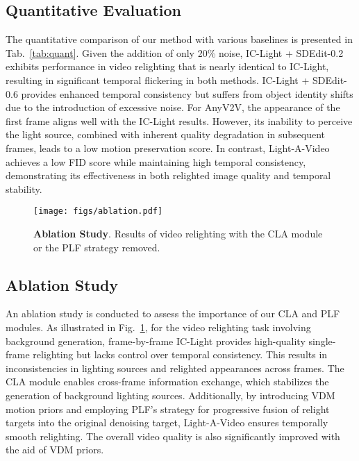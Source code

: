 \subsection{Quantitative Evaluation}
\label{sec:QE}
The quantitative comparison of our method with various baselines is presented in Tab.~\ref{tab:quant}.
Given the addition of only 20\% noise, IC-Light + SDEdit-0.2 exhibits performance in video relighting 
that is nearly identical to IC-Light, resulting in significant temporal flickering in both methods. 
IC-Light + SDEdit-0.6 provides enhanced temporal consistency but suffers from object identity shifts due to the introduction of excessive noise.
For AnyV2V, the appearance of the first frame aligns well with the IC-Light results.
However, its inability to perceive the light source, 
combined with inherent quality degradation in subsequent frames, 
leads to a low motion preservation score. 
In contrast, Light-A-Video achieves a low FID score while maintaining high temporal consistency,
demonstrating its effectiveness in both relighted image quality and temporal stability.

\begin{figure}[htp]
\centering
\texttt{[image: figs/ablation.pdf]}
\vspace{-2.5em}
\caption{{\bf Ablation Study}. 
Results of video relighting with the CLA module or the PLF strategy removed.
}
\label{fig:ablation}
\vspace{-1.5em}
\end{figure}

\vspace{-0.5em}
\subsection{Ablation Study}
\label{sec:abla}
An ablation study is conducted to assess the importance of our CLA and PLF modules.
As illustrated in Fig.~\ref{fig:ablation}, for the video relighting task involving background generation,
frame-by-frame IC-Light provides high-quality single-frame relighting but lacks control over temporal consistency.
This results in inconsistencies in lighting sources and relighted appearances across frames.
The CLA module enables cross-frame information exchange, which stabilizes the generation of background lighting sources.
Additionally, by introducing VDM motion priors and employing PLF's strategy for progressive fusion of relight targets 
into the original denoising target,
Light-A-Video ensures temporally smooth relighting.
The overall video quality is also significantly improved with the aid of VDM priors.

